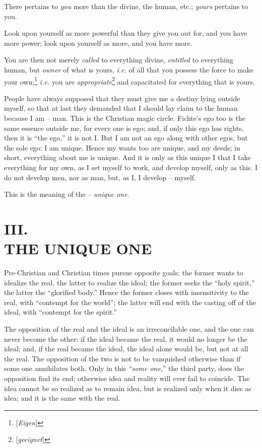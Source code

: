 \documentclass[12pt,a4paper]{book}
\begin{document}
There pertains to \textit{you} more than the divine, the human, etc.; 
\textit{yours} pertains to you.

Look upon yourself as more powerful than they give you out for, and you have 
more power; look upon yourself as more, and you have more.

You are then not merely \textit{called} to everything divine, 
\textit{entitled} to everything human, but \textit{owner} of what is yours, 
\textit{i.e.} of all that you possess the force to make your 
own;\footnote{[\textit{Eigen}]} \textit{i.e.} you are 
\textit{appropriate}\footnote{[\textit{geeignet}]} and capacitated for 
everything that is yours.

People have always supposed that they must give me a destiny lying outside 
myself, so that at last they demanded that I should lay claim to the human 
because I am -- man. This is the Christian magic circle. Fichte's ego too is 
the same essence outside me, for every one is ego; and, if only this ego has 
rights, then it is ``the ego,'' it is not I. But I am not an ego along with 
other egos, but the sole ego: I am unique. Hence my wants too are unique, and 
my deeds; in short, everything about me is unique. And it is only as this 
unique I that I take everything for my own, as I set myself to work, and 
develop myself, only as this. I do not develop men, nor as man, but, as I, I 
develop -- myself.

This is the meaning of the -- \textit{unique one}.

\chapter[III. The Unique One]{\centering III.\\
THE UNIQUE ONE}

Pre-Christian and Christian times pursue opposite goals; the former wants to 
idealize the real, the latter to realize the ideal; the former seeks the 
``holy spirit,'' the latter the ``glorified body.'' Hence the former 
closes with insensitivity to the real, with ``contempt for the world''; the 
latter will end with the casting off of the ideal, with ``contempt for the 
spirit.''

The opposition of the real and the ideal is an irreconcilable one, and the one 
can never become the other: if the ideal became the real, it would no longer 
be the ideal; and, if the real became the ideal, the ideal alone would be, but 
not at all the real. The opposition of the two is not to be vanquished 
otherwise than if some one annihilates both. Only in this \textit{``some 
one},'' the third party, does the opposition find its end; otherwise idea and 
reality will ever fail to coincide. The idea cannot be so realized as to 
remain idea, but is realized only when it dies as idea; and it is the same 
with the real.
\end{document}
